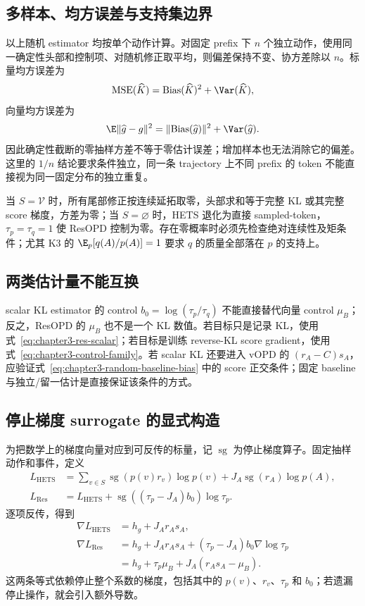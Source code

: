 \subsection{多样本、均方误差与支持集边界}

以上随机 estimator 均按单个动作计算。对固定 prefix 下 $n$ 个独立动作，使用同一确定性头部和控制项、对随机修正取平均，则偏差保持不变、协方差除以 $n$。标量均方误差为
\[
 \operatorname{MSE}(\widehat K)=\operatorname{Bias}(\widehat K)^2+\Var(\widehat K),
\]
向量均方误差为
\[
 \E\lVert\widehat g-g\rVert^2
 =\lVert\operatorname{Bias}(\widehat g)\rVert^2+\Var(\widehat g).
\]
因此确定性截断的零抽样方差不等于零估计误差；增加样本也无法消除它的偏差。这里的 $1/n$ 结论要求条件独立，同一条 trajectory 上不同 prefix 的 token 不能直接视为同一固定分布的独立重复。

当 $S=\mathcal V$ 时，所有尾部修正按连续延拓取零，头部求和等于完整 KL 或其完整 score 梯度，方差为零；当 $S=\varnothing$ 时，HETS 退化为直接 sampled-token，$\tau_p=\tau_q=1$ 使 ResOPD 控制为零。存在零概率时必须先检查绝对连续性及矩条件；尤其 K3 的 $\E_p[q(A)/p(A)]=1$ 要求 $q$ 的质量全部落在 $p$ 的支持上。

\subsection{两类估计量不能互换}

scalar KL estimator 的 control $b_0=\log(\tau_p/\tau_q)$ 不能直接替代向量 control $\mu_B$；反之，ResOPD 的 $\mu_B$ 也不是一个 KL 数值。若目标只是记录 KL，使用式~\eqref{eq:chapter3-res-scalar}；若目标是训练 reverse-KL score gradient，使用式~\eqref{eq:chapter3-control-family}。若 scalar KL 还要进入 vOPD 的 $(r_A-C)s_A$，应验证式~\eqref{eq:chapter3-random-baseline-bias} 中的 score 正交条件；固定 baseline 与独立/留一估计是直接保证该条件的方式。

\subsection{停止梯度 surrogate 的显式构造}

为把数学上的梯度向量对应到可反传的标量，记 $\operatorname{sg}$ 为停止梯度算子。固定抽样动作和事件，定义
\begin{align*}
 L_{\mathrm{HETS}}
 &=\sum_{v\in S}\operatorname{sg}(p(v)r_v)\log p(v)
   +J_A\operatorname{sg}(r_A)\log p(A),\\
 L_{\mathrm{Res}}
 &=L_{\mathrm{HETS}}
   +\operatorname{sg}((\tau_p-J_A)b_0)\log\tau_p.
\end{align*}
逐项反传，得到
\begin{align*}
 \nabla L_{\mathrm{HETS}}&=h_g+J_Ar_As_A,\\
 \nabla L_{\mathrm{Res}}
 &=h_g+J_Ar_As_A+(\tau_p-J_A)b_0\nabla\log\tau_p\\
 &=h_g+\tau_p\mu_B+J_A(r_As_A-\mu_B).
\end{align*}
这两条等式依赖停止整个系数的梯度，包括其中的 $p(v)$、$r_v$、$\tau_p$ 和 $b_0$；若遗漏停止操作，就会引入额外导数。


